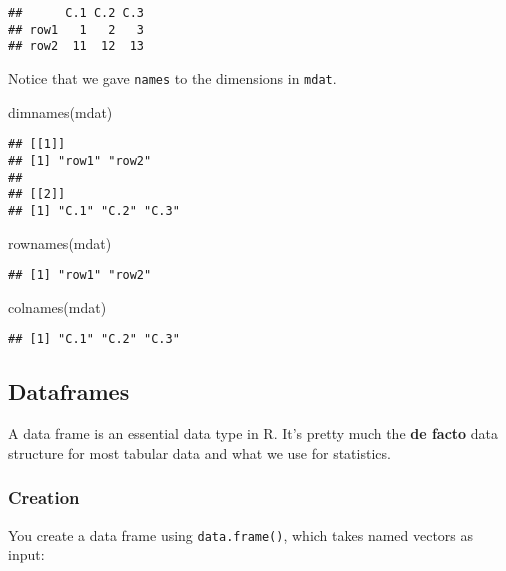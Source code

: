\documentclass[
]{book}
\newenvironment{Shaded}{\begin{snugshade}}{\end{snugshade}}
\newcommand{\FunctionTok}[1]{\textcolor[rgb]{0.00,0.00,0.00}{#1}}
\newcommand{\NormalTok}[1]{#1}
\begin{document}
\begin{verbatim}
##      C.1 C.2 C.3
## row1   1   2   3
## row2  11  12  13
\end{verbatim}

Notice that we gave \texttt{names} to the dimensions in \texttt{mdat}.

\begin{Shaded}
\begin{Highlighting}[]
\FunctionTok{dimnames}\NormalTok{(mdat)}
\end{Highlighting}
\end{Shaded}

\begin{verbatim}
## [[1]]
## [1] "row1" "row2"
## 
## [[2]]
## [1] "C.1" "C.2" "C.3"
\end{verbatim}

\begin{Shaded}
\begin{Highlighting}[]
\FunctionTok{rownames}\NormalTok{(mdat)}
\end{Highlighting}
\end{Shaded}

\begin{verbatim}
## [1] "row1" "row2"
\end{verbatim}

\begin{Shaded}
\begin{Highlighting}[]
\FunctionTok{colnames}\NormalTok{(mdat)}
\end{Highlighting}
\end{Shaded}

\begin{verbatim}
## [1] "C.1" "C.2" "C.3"
\end{verbatim}

\hypertarget{dataframes}{%
\subsection{Dataframes}\label{dataframes}}

A data frame is an essential data type in R. It's pretty much the \textbf{de facto} data structure for most tabular data and what we use for statistics.

\hypertarget{creation}{%
\subsubsection{Creation}\label{creation}}

You create a data frame using \texttt{data.frame()}, which takes named vectors as input:
\end{document}
